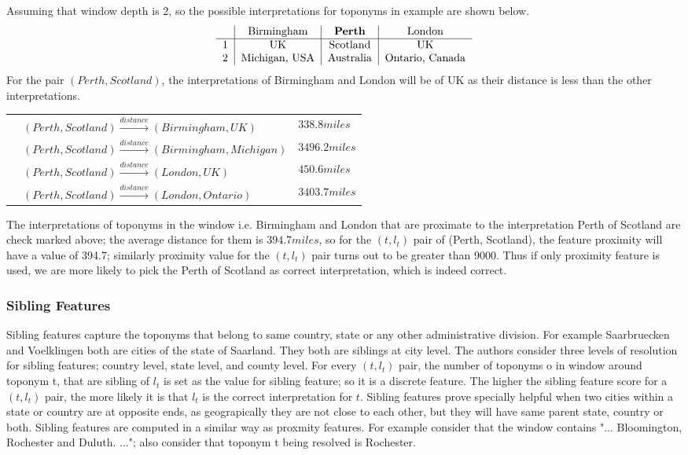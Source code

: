 \documentclass[
     11pt,         %
     a4paper,      %
     oneside,
     ]{article}
\begin{document}
Assuming that window depth is 2, so the possible interpretations for toponyms in example are shown below.
$$
\begin{tabular}{ c| c | c | c}
	
	{} & Birmingham & \textbf{Perth} & London \\
	\hline
	1 & UK & Scotland & UK \\
	2 & Michigan, USA & Australia & Ontario, Canada \\
\end{tabular}
$$
For the pair $(Perth, Scotland)$, the interpretations of Birmingham and London  will be of UK as their distance is less than the other interpretations. 

\begin{tabular}{c l l}
	\checkmark & $(Perth, Scotland) \xrightarrow{distance} (Birmingham, UK)$ & $338.8 miles$\\
	{} & $(Perth, Scotland) \xrightarrow{distance} (Birmingham, Michigan)$ & $3496.2 miles$ \\
	\checkmark & $(Perth, Scotland) \xrightarrow{distance} (London, UK)$ & $450.6 miles$ \\
	{} & $(Perth, Scotland) \xrightarrow{distance} (London, Ontario)$ & $3403.7 miles$ \\
\end{tabular}

The interpretations of toponyms in the window i.e. Birmingham and London that are proximate to the interpretation Perth of Scotland are check marked above; the average distance for them is $394.7 miles$, so for the $(t, l_t)$ pair of (Perth, Scotland), the feature proximity will have a value of 394.7; similarly proximity value for the $(t,l_t)$ pair turns out to be greater than 9000. Thus if only proximity feature is used, we are more likely to pick the Perth of Scotland as correct interpretation, which is indeed correct.  

\subsubsection{Sibling Features}\label{sec:sibling-features}
Sibling features capture the toponyms that belong to same country, state or any other administrative division. For example Saarbruecken and Voelklingen both are cities of the state of Saarland. They both are siblings at city level. The authors consider three levels of resolution for sibling features; country level, state level, and county level. For every $(t, l_t)$ pair, the number of toponyms o in window around toponym t, that are sibling of $l_t$ is set as the value for sibling feature; so it is a discrete feature. The higher the sibling feature score for a $(t, l_t)$ pair, the more likely it is that $l_t$ is the correct interpretation for $t$. Sibling features prove specially helpful when two cities within a state or country are at opposite ends, as geograpically they are not close to each other, but they will have same parent state, country or both. Sibling features are computed in a similar way as proxmity features. For example consider that the window contains "... Bloomington, Rochester and Duluth. ..."; also consider that toponym t being resolved is Rochester. 
\end{document}

